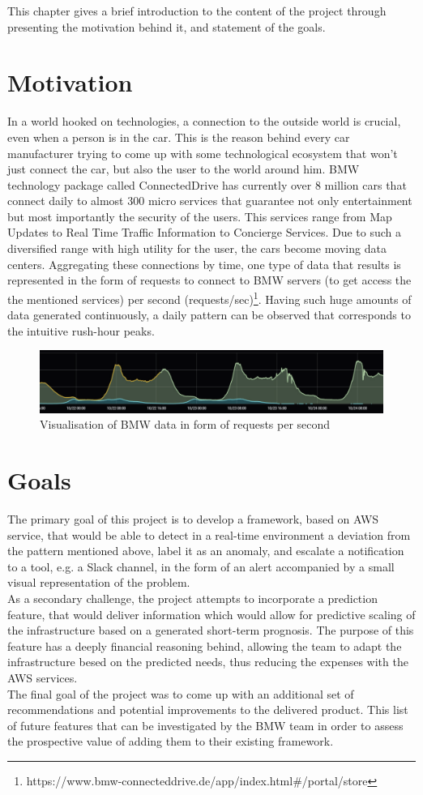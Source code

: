 This chapter gives a brief introduction to the content of the project through presenting the motivation behind it, and statement of the goals.
    \section{Motivation}
In a world hooked on technologies, a connection to the outside world is crucial, even when a person is in the car. This is the reason behind every car manufacturer trying to come up with some technological ecosystem that won’t just connect the car, but also the user to the world around him.
BMW technology package called ConnectedDrive has currently over 8 million cars that connect daily to almost 300 micro services that guarantee not only entertainment but most importantly the security of the users. This services range from Map Updates to Real Time Traffic Information to Concierge Services. Due to such a diversified range with high utility for the user, the cars become moving data centers.
Aggregating these connections by time, one type of data that results is represented in the form of requests to connect to BMW servers (to get access the the mentioned services)  per second (requests/sec)\footnote{https://www.bmw-connecteddrive.de/app/index.html\#/portal/store}. 
Having such huge amounts of data generated continuously, a daily pattern can be observed that corresponds to the intuitive rush-hour peaks.
\begin{figure}[h]
    \centering
    \includegraphics[width=1\textwidth]{images/data-graph.png}
    \caption{Visualisation of BMW data in form of requests per second }
\end{figure}

    \section{Goals}
The primary goal of this project is to develop a framework, based on AWS service, that would be able to detect in a real-time environment a deviation from the pattern mentioned above, label it as an anomaly, and escalate a notification to a tool, e.g. a Slack channel, in the form of an alert accompanied by a small visual representation of the problem.\\
As a secondary challenge, the project attempts to incorporate a prediction feature, that would deliver information which would allow for predictive scaling of the infrastructure based on a generated short-term prognosis. The purpose of this feature has a deeply financial reasoning behind, allowing the team to adapt the infrastructure besed on the predicted needs, thus reducing the expenses with the AWS services. \\
The final goal of the project was to come up with an additional set of recommendations and potential improvements to the delivered product.  This list of future features that can be investigated by the BMW team in order to assess the prospective value of adding them to their existing framework.